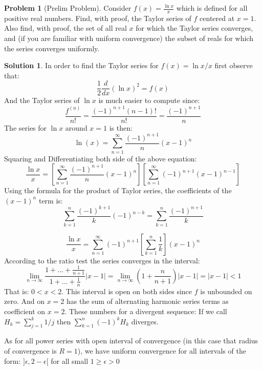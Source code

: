 \documentclass{article}
\theoremstyle{definition}
\newtheorem*{soln}{Solution}
\newtheorem*{prob}{Problem}
\theoremstyle{theorem}
\begin{document}
\begin{prob}[Prelim Problem]
Consider $f(x) = \frac{\ln x}{x}$ which is defined for all positive real numbers. Find, with proof, the Taylor series of $f$ centered at $x=1$. Also find, with proof, the set of all real $x$ for which the Taylor series converges, and (if you are familiar with uniform convergence) the subset of reals for which the series converges uniformly.
\end{prob}
\begin{soln}
	In order to find the Taylor series for $ f(x) = \ln x/x$ first observe that:
	$$\frac 12\frac d{dx}(\ln x)^2 = f(x)$$ 
	And the Taylor series of $\ln x$ is much easier to compute since:
	$$\frac{f^{(n)}}{n!} = \frac{(-1)^{n+1}(n-1)!}{n!} = \frac{(-1)^{n+1}}{n}$$
	The series for $\ln x$ around $x=1$ is then:
	$$\ln(x) = \sum_{n=1}^\infty \frac{(-1)^{n+1}}{n}(x-1)^n $$
	Squaring and Differentiating both side of the above equation: 
	$$\frac {\ln x}{x} = \left[\sum_{n=1}^\infty \frac{(-1)^{n+1}}{n}(x-1)^n\right]\left[ \sum_{n=1}^\infty (-1)^{n+1} (x-1)^{n-1}\right]$$
	Using the formula for the product of Taylor series, the  coefficients of the $(x-1)^n$ term is:
	$$\sum_{k=1}^n \frac{(-1)^{k+1}}{k}(-1)^{n-k} =\sum_{k=1}^n \frac{(-1)^{n+1}}{k}$$ 

	$$\frac{\ln x}x = \sum_{n=1}^\infty (-1)^{n+1}\left[ \sum_{k=1}^n \frac 1k\right] (x-1)^n$$
	According to the ratio test the series converges in the interval:
	$$\lim_{n\to \infty} \frac{1+\ldots + \frac 1{n+1}}{1+\ldots + \frac 1n}|x-1| = \lim_{n\to \infty} \left( 1+ \frac n{n+1} \right) |x-1| = |x-1| <1 $$
	That is: $0<x<2$. This interval is open on both sides since $f$ is unbounded on zero.  And on $x=2$ has the sum of alternating harmonic series terms as coefficient on $x=2$. These numbers for a divergent sequence: If we call $H_k=\sum_{j=1}^k 1/j$ then $\sum_{k=1}^n (-1)^k H_k$ diverges.

	As for all power series with open interval of convergence (in this case that radius of convergence is $R=1$), we have uniform convergence for all intervals of the form: $]\epsilon, 2-\epsilon[$ for all small $1\geq \epsilon>0$

\end{soln}
\vspace{1in}
\end{document}

